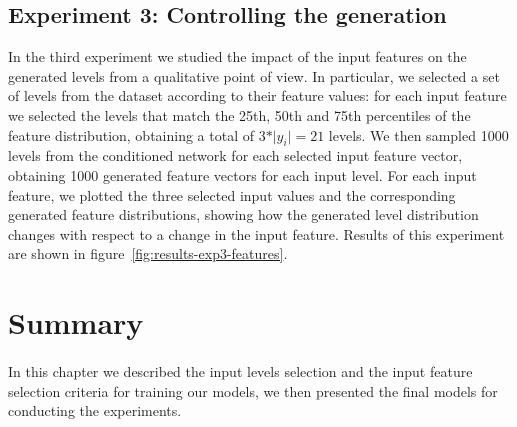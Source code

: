 \subsection{Experiment 3: Controlling the generation}
In the third experiment we studied the impact of the input features on the generated levels from a qualitative point of view. In particular, we selected a set of levels from the dataset according to their feature values: for each input feature we selected the levels that match the 25th, 50th and 75th percentiles of the feature distribution, obtaining a total of $3 * \vert y_{i} \vert = 21$ levels. We then sampled 1000 levels from the conditioned network for each selected input feature vector, obtaining 1000 generated feature vectors for each input level. For each input feature, we plotted the three selected input values and the corresponding generated feature distributions, showing how the generated level distribution changes with respect to a change in the input feature. Results of this experiment are shown in figure~\ref{fig:results-exp3-features}.




\section{Summary}
\paragraph{} In this chapter we described the input levels selection and the input feature selection criteria for training our models, we then presented the final models for conducting the experiments. 